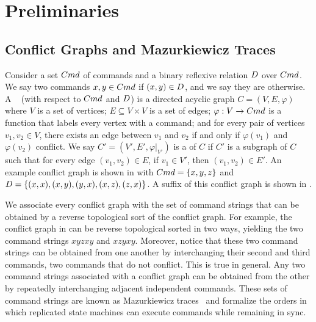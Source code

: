 \section{Preliminaries}

\subsection{Conflict Graphs and Mazurkiewicz Traces}
Consider a set $Cmd$ of commands and a binary reflexive relation $D$
over $Cmd$. We say two commands $x, y \in Cmd$  if $(x, y)
\in D$, and we say they are  otherwise. A
~\cite{mazurkiewicz1995introduction} (with respect to
$Cmd$ and $D$) is a directed acyclic graph $C = (V, E, \varphi)$ where
%
  $V$ is a set of vertices;
%
  $E \subseteq V \times V$ is a set of edges;
%
  $\varphi: V \to Cmd$ is a function that labels every vertex with a command;
  and
%
  for every pair of vertices $v_1, v_2 \in V$, there exists an edge between
  $v_1$ and $v_2$ if and only if $\varphi(v_1)$ and $\varphi(v_2)$ conflict.
%
We say $C' = (V', E', \varphi|_{V'})$ is a  of $C$ if $C'$ is a
subgraph of $C$ such that for every edge $(v_1, v_2) \in E$, if $v_1 \in V'$,
then $(v_1, v_2) \in E'$.
%
An example conflict graph is shown in  with $Cmd
= \{x, y, z\}$ and $D = \{(x, x), (x, y), (y, x), (x, z), (z,
x)\}$. A suffix of this conflict graph is shown in .

{}

We associate every conflict graph with the set of command strings that can be
obtained by a reverse topological sort of the conflict graph. For example, the
conflict graph in  can be reverse topological
sorted in two ways, yielding the two command strings $xyzxy$ and $xzyxy$.
Moreover, notice that these two command strings can be obtained from one
another by interchanging their second and third commands, two commands that do
not conflict. This is true in general. Any two command strings associated with
a conflict graph can be obtained from the other by repeatedly interchanging
adjacent independent commands. These sets of command strings are known as
Mazurkiewicz traces~\cite{mazurkiewicz1985semantics,
mazurkiewicz1995introduction} and formalize the orders in which replicated
state machines can execute commands while remaining in sync.

